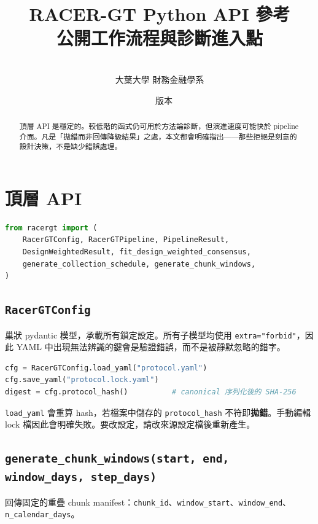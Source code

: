 \documentclass[12pt,a4paper,oneside]{article}
\title{\bfseries RACER-GT Python API 參考\\[0.4em]
\large 公開工作流程與診斷進入點}
\author{\racerauthor\\\small 大葉大學 財務金融學系}
\date{\racerdate\ \textbullet\ 版本 \racerversion}
\begin{document}
\maketitle

\begin{abstract}
\noindent 頂層 API 是穩定的。較低階的函式仍可用於方法論診斷，但演進速度可能快於 pipeline 介面。凡是「拋錯而非回傳降級結果」之處，本文都會明確指出——那些拒絕是刻意的設計決策，不是缺少錯誤處理。
\end{abstract}

\tableofcontents
\newpage

\section{頂層 API}

\begin{lstlisting}[language=Python]
from racergt import (
    RacerGTConfig, RacerGTPipeline, PipelineResult,
    DesignWeightedResult, fit_design_weighted_consensus,
    generate_collection_schedule, generate_chunk_windows,
)
\end{lstlisting}

\subsection{\texttt{RacerGTConfig}}

巢狀 pydantic 模型，承載所有鎖定設定。所有子模型均使用 \texttt{extra="forbid"}，因此 YAML 中出現無法辨識的鍵會是驗證錯誤，而不是被靜默忽略的錯字。

\begin{lstlisting}[language=Python]
cfg = RacerGTConfig.load_yaml("protocol.yaml")
cfg.save_yaml("protocol.lock.yaml")
digest = cfg.protocol_hash()          # canonical 序列化後的 SHA-256
\end{lstlisting}

\texttt{load\_yaml} 會重算 hash，若檔案中儲存的 \texttt{protocol\_hash} 不符即\textbf{拋錯}。手動編輯 lock 檔因此會明確失敗。要改設定，請改來源設定檔後重新產生。

\subsection{\texttt{generate\_chunk\_windows(start, end, window\_days, step\_days)}}

回傳固定的重疊 chunk manifest：\texttt{chunk\_id}、\texttt{window\_start}、\texttt{window\_end}、\texttt{n\_calendar\_days}。
\end{document}
